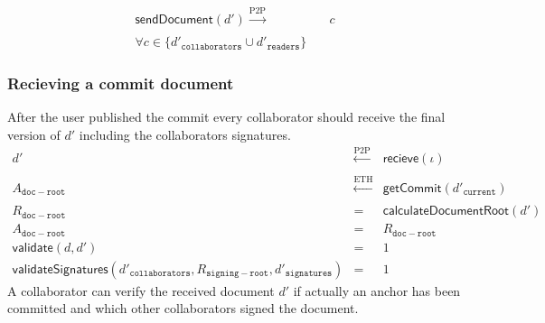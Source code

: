 \begin{equation}
\begin{split}
    \mathsf{sendDocument}(d') \xrightarrow[]{\text{P2P}}&\quad c \\ \forall c \in   \{ {d'}_{\texttt{collaborators}} \cup {d'}_{\texttt{readers}} \}
    \end{split}
\end{equation}
\subsubsection{Recieving a commit document}
After the user published the commit every collaborator should receive the final version of $d'$ including the collaborators signatures.
\begin{eqnarray}
    d' & \xleftarrow[]{\text{P2P}} & \mathsf{recieve}(\iota) \\
        A_{\mathtt{doc-root}} & \xleftarrow[]{\text{ETH}} & \mathsf{getCommit}(d'_{\mathtt{current}}) \\
    R_{\mathtt{doc-root}} & = & \mathsf{calculateDocumentRoot}(d')  \\
    A_{\mathtt{doc-root}} &= &R_{\mathtt{doc-root}} \\
   \mathsf{validate}(d, d') & = & 1\\
     \mathsf{validateSignatures}(d'_{\mathtt{collaborators}},R_{\mathtt{signing-root}},d'_{\mathtt{signatures}}) & = & 1
\end{eqnarray}
A collaborator can verify the received document $d'$ if actually an anchor has been committed and which other collaborators signed the document.


